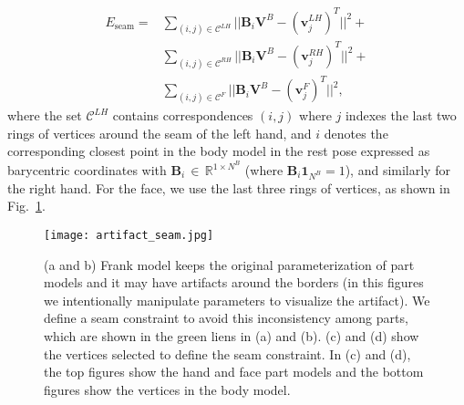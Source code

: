 \documentclass[11pt,english]{article}
\begin{document}
\begin{align}
E_\textrm{seam} = &\sum_{(i,j)\in\mathcal{C}^{LH}} || \mathbf{B}_i\mathbf{V}^B - (\mathbf{v}^{LH}_{j})^T ||^2 +\\
 &\sum_{(i,j)\in\mathcal{C}^{RH}} || \mathbf{B}_i \mathbf{V}^B - (\mathbf{v}^{RH}_{j})^T ||^2 +\\
  &\sum_{(i,j)\in\mathcal{C}^{F}} || \mathbf{B}_i \mathbf{V}^B - (\mathbf{v}^{F}_{j})^T ||^2,
\label{eq:glue_constraints}
\end{align}
where the set $\mathcal{C}^{LH}$ contains correspondences $(i,j)$ where $j$ indexes the last two rings of vertices around the seam of the left hand, and $i$ denotes the corresponding closest point in the body model in the rest pose expressed as barycentric coordinates with $\mathbf{B}_i\,{\in}\,\mathds{R}^{1\times N^B}$ (where $\mathbf{B}_i\mathbf{1}_{N^B}{=}1$), and similarly for the right hand. For the face, we use the last three rings of vertices, as shown in Fig.~\ref{fig:seams}.
\begin{figure}[t]
    \centering
    \texttt{[image: artifact\_seam.jpg]}
    \caption{ (a and b) Frank model keeps the original parameterization of part models and it may have artifacts around the borders (in this figures we intentionally manipulate parameters to visualize the artifact). We define a seam constraint to avoid this inconsistency among parts, which are shown in the green liens in (a) and (b). (c) and (d) show the vertices selected to define the seam constraint. In (c) and (d), the top figures show the hand and face part models and the bottom figures show the vertices in the body model.}
    \label{fig:seams}
\end{figure}
\end{document}

